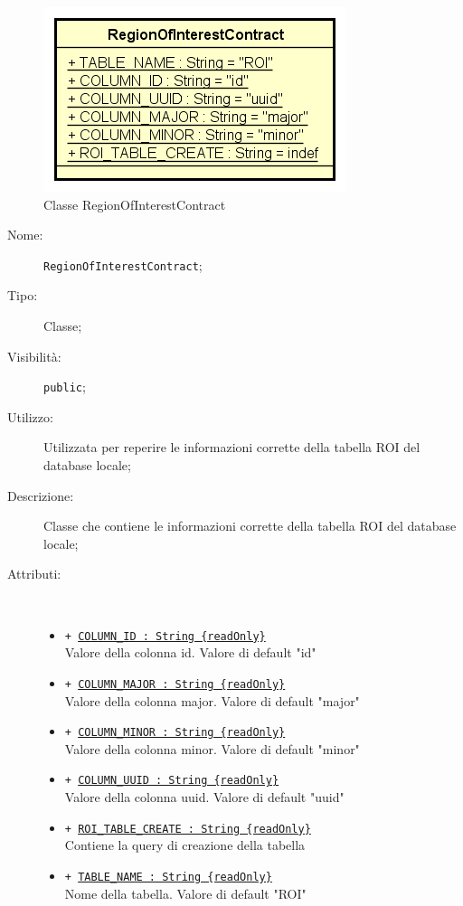 \documentclass[../DefinizioneDiProdotto.tex]{subfiles}
\begin{document}
    \begin{figure}[H]
        \centering
        \includegraphics{img/RegionOfInterestContract.png}
        \caption{Classe RegionOfInterestContract}\label{fig:model::dataaccess::dao::RegionOfInterestContract} 
    \end{figure}
    \begin{description}
\item[Nome:] \texttt{RegionOfInterestContract};
\item[Tipo:] Classe;
\item[Visibilità:] \texttt{public};
\item[Utilizzo:] Utilizzata per reperire le informazioni corrette della tabella ROI del database locale;
\item[Descrizione:] Classe che contiene le informazioni corrette della tabella ROI del database locale;
\item[Attributi:] \
\begin{itemize}
\item \texttt{+ \underline{COLUMN\_ID : String \{readOnly\}}}\\
Valore della colonna id. Valore di default "id"

\item \texttt{+ \underline{COLUMN\_MAJOR : String \{readOnly\}}}\\
Valore della colonna major. Valore di default "major"

\item \texttt{+ \underline{COLUMN\_MINOR : String \{readOnly\}}}\\
Valore della colonna minor. Valore di default "minor"

\item \texttt{+ \underline{COLUMN\_UUID : String \{readOnly\}}}\\
Valore della colonna uuid. Valore di default "uuid"

\item \texttt{+ \underline{ROI\_TABLE\_CREATE : String \{readOnly\}}}\\
Contiene la query di creazione della tabella

\item \texttt{+ \underline{TABLE\_NAME : String \{readOnly\}}}\\
Nome della tabella. Valore di default "ROI"

\end{itemize}
\end{description}
\end{document}

